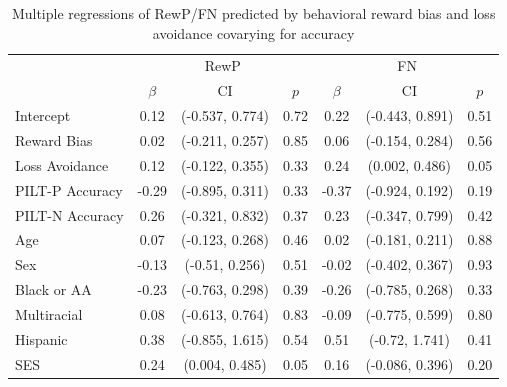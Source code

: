 \documentclass[english,man,floatsintext]{apa6}
\begin{document}
\begin{table}[tbp]

\begin{center}
\begin{threeparttable}

\caption{\label{tab:unnamed-chunk-8}Multiple regressions of RewP/FN predicted by behavioral reward bias and loss avoidance covarying for accuracy}

\begin{tabular}{lcccccc}
\toprule
 \multicolumn{1}{c}{ } & \multicolumn{3}{c}{RewP} & \multicolumn{3}{c}{FN} \\
\cmidrule(r){1-1} \cmidrule(r){2-4} \cmidrule(r){5-7}
  & $\beta$ & CI & $p$ & $\beta$ & CI & $p$\\
\midrule
Intercept & 0.12 & (-0.537, 0.774) & 0.72 & 0.22 & (-0.443, 0.891) & 0.51\\
Reward Bias & 0.02 & (-0.211, 0.257) & 0.85 & 0.06 & (-0.154, 0.284) & 0.56\\
Loss Avoidance & 0.12 & (-0.122, 0.355) & 0.33 & 0.24 & (0.002, 0.486) & 0.05\\
PILT-P Accuracy & -0.29 & (-0.895, 0.311) & 0.33 & -0.37 & (-0.924, 0.192) & 0.19\\
PILT-N Accuracy & 0.26 & (-0.321, 0.832) & 0.37 & 0.23 & (-0.347, 0.799) & 0.42\\
Age & 0.07 & (-0.123, 0.268) & 0.46 & 0.02 & (-0.181, 0.211) & 0.88\\
Sex & -0.13 & (-0.51, 0.256) & 0.51 & -0.02 & (-0.402, 0.367) & 0.93\\
Black or AA & -0.23 & (-0.763, 0.298) & 0.39 & -0.26 & (-0.785, 0.268) & 0.33\\
Multiracial & 0.08 & (-0.613, 0.764) & 0.83 & -0.09 & (-0.775, 0.599) & 0.80\\
Hispanic & 0.38 & (-0.855, 1.615) & 0.54 & 0.51 & (-0.72, 1.741) & 0.41\\
SES & 0.24 & (0.004, 0.485) & 0.05 & 0.16 & (-0.086, 0.396) & 0.20\\
\bottomrule
\end{tabular}

\end{threeparttable}
\end{center}

\end{table}
\end{document}
